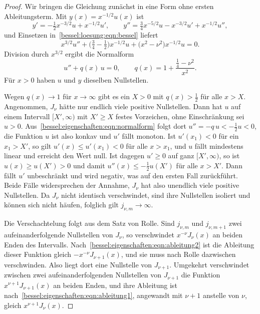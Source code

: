 \begin{proof}
Wir bringen die Gleichung zunächst in eine Form ohne ersten
Ableitungsterm.
Mit $y(x)=x^{-1/2}u(x)$ ist
\[
y' = -\tfrac12 x^{-3/2}u + x^{-1/2}u',
\qquad
y'' = \tfrac34 x^{-5/2}u - x^{-3/2}u' + x^{-1/2}u'' ,
\]
und Einsetzen in~\eqref{bessel:loesung:eqn:bessel} liefert
\[
x^{3/2}u''
+
\bigl(\tfrac34-\tfrac12\bigr)x^{-1/2}u
+
\bigl(x^{2}-\nu^2\bigr)x^{-1/2}u
=
0 .
\]
Division durch $x^{3/2}$ ergibt die Normalform
\begin{equation}
u'' + q(x)\,u = 0,
\qquad
q(x) = 1 + \frac{\frac14-\nu^2}{x^2} .
\label{bessel:eigenschaften:eqn:normalform}
\end{equation}
Für $x>0$ haben $u$ und $y$ dieselben Nullstellen.

Wegen $q(x)\to 1$ für $x\to\infty$ gibt es ein $X>0$ mit $q(x)>\frac12$ für alle $x>X$.
Angenommen, $J_\nu$ hätte nur endlich viele positive Nullstellen.
Dann hat $u$ auf einem Intervall $[X',\infty)$ mit $X'\ge X$ festes Vorzeichen, ohne Einschränkung sei $u>0$.
Aus~\eqref{bessel:eigenschaften:eqn:normalform} folgt dort $u''=-q\,u<-\frac12 u<0$, die Funktion $u$ ist also konkav und $u'$ fällt monoton.
Ist $u'(x_1)<0$ für ein $x_1>X'$, so gilt $u'(x)\le u'(x_1)<0$ für alle $x>x_1$, und $u$ fällt mindestens linear und erreicht den Wert null.
Ist dagegen $u'\ge 0$ auf ganz $[X',\infty)$, so ist $u(x)\ge u(X')>0$ und damit $u''(x)\le-\frac12u(X')$ für alle $x>X'$.
Dann fällt $u'$ unbeschränkt und wird negativ, was auf den ersten Fall zurückführt.
Beide Fälle widersprechen der Annahme, $J_\nu$ hat also unendlich viele positive Nullstellen.
Da $J_\nu$ nicht identisch verschwindet, sind ihre Nullstellen isoliert und können sich nicht häufen, folglich gilt $j_{\nu,m}\to\infty$.

Die Verschachtelung folgt aus dem Satz von Rolle.
Sind $j_{\nu,m}$ und $j_{\nu,m+1}$ zwei aufeinanderfolgende Nullstellen von $J_\nu$, so verschwindet $x^{-\nu}J_\nu(x)$ an beiden Enden des Intervalls.
Nach~\eqref{bessel:eigenschaften:eqn:ableitung2} ist die Ableitung dieser Funktion gleich $-x^{-\nu}J_{\nu+1}(x)$, und sie muss nach Rolle dazwischen verschwinden.
Also liegt dort eine Nullstelle von $J_{\nu+1}$.
Umgekehrt verschwindet zwischen zwei aufeinanderfolgenden Nullstellen von $J_{\nu+1}$ die Funktion $x^{\nu+1}J_{\nu+1}(x)$ an beiden Enden, und ihre Ableitung ist nach~\eqref{bessel:eigenschaften:eqn:ableitung1}, angewandt mit $\nu+1$ anstelle von $\nu$, gleich $x^{\nu+1}J_\nu(x)$.
\end{proof}
 
